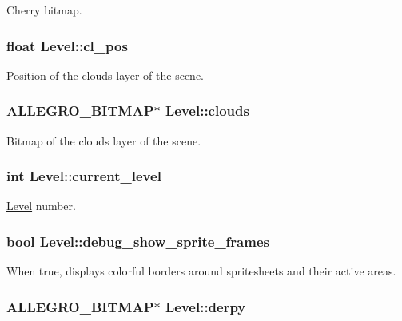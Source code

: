 \-Cherry bitmap. \hypertarget{structLevel_af466533be369b5ce1f48196a7f3b7b0b}{
\subsubsection[{cl\-\_\-pos}]{\setlength{\rightskip}{0pt plus 5cm}float {\bf \-Level\-::cl\-\_\-pos}}}\label{structLevel_af466533be369b5ce1f48196a7f3b7b0b}
\-Position of the clouds layer of the scene. \hypertarget{structLevel_a27d34b57b66d4e7f733cb6a5cc16ff18}{
\subsubsection[{clouds}]{\setlength{\rightskip}{0pt plus 5cm}\-A\-L\-L\-E\-G\-R\-O\-\_\-\-B\-I\-T\-M\-A\-P$\ast$ {\bf \-Level\-::clouds}}}\label{structLevel_a27d34b57b66d4e7f733cb6a5cc16ff18}
\-Bitmap of the clouds layer of the scene. \hypertarget{structLevel_a1ba3ee0104c912dde5d6e70fee889512}{
\subsubsection[{current\-\_\-level}]{\setlength{\rightskip}{0pt plus 5cm}int {\bf \-Level\-::current\-\_\-level}}}\label{structLevel_a1ba3ee0104c912dde5d6e70fee889512}
\hyperlink{structLevel}{\-Level} number. \hypertarget{structLevel_a1df786b74cff642434ea6587e6141b4d}{
\subsubsection[{debug\-\_\-show\-\_\-sprite\-\_\-frames}]{\setlength{\rightskip}{0pt plus 5cm}bool {\bf \-Level\-::debug\-\_\-show\-\_\-sprite\-\_\-frames}}}\label{structLevel_a1df786b74cff642434ea6587e6141b4d}
\-When true, displays colorful borders around spritesheets and their active areas. \hypertarget{structLevel_ae33832497116b7a0c184959bbde21ee5}{
\subsubsection[{derpy}]{\setlength{\rightskip}{0pt plus 5cm}\-A\-L\-L\-E\-G\-R\-O\-\_\-\-B\-I\-T\-M\-A\-P$\ast$ {\bf \-Level\-::derpy}}}\label{structLevel_ae33832497116b7a0c184959bbde21ee5}
